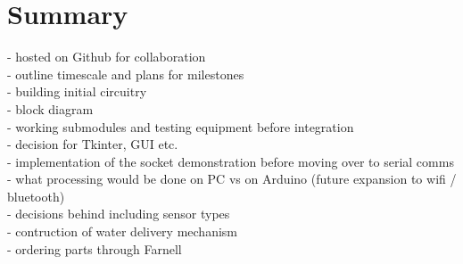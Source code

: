 \documentclass[a4paper,11pt]{article}
\begin{document}
\section{Summary}
\label{sec:Summary}
- hosted on Github for collaboration \\
- outline timescale and plans for milestones\\
- building initial circuitry\\
- block diagram\\
- working submodules and testing equipment before integration\\
- decision for Tkinter, GUI etc.\\
- implementation of the socket demonstration before moving over to serial comms \\
- what processing would be done on PC vs on Arduino (future expansion to wifi / bluetooth)\\
- decisions behind including sensor types \\
- contruction of water delivery mechanism\\
- ordering parts through Farnell

\begin{table}[H]
    \centering
    \renewcommand{\arraystretch}{1.5} 
    \caption{Component Order Summary}
    \label{tab:component_order}
\end{table}
\end{document}
